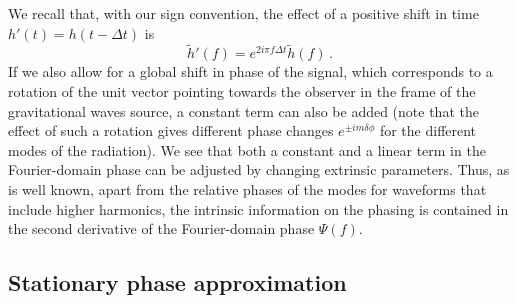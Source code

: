 \documentclass[aps,showpacs,twocolumn,
prd,superscriptaddress,nofootinbib]{revtex4-1}
\newcommand{\be}{\begin{equation}}
\newcommand{\ee}{\end{equation}}
\begin{document}
We recall that, with our sign convention, the effect of a positive shift in time $h' (t) = h(t- \Delta t)$ is
\be
	\tilde{h}'(f) = e^{2i\pi f \Delta t} \tilde{h}(f) \,.
\ee
If we also allow for a global shift in phase of the signal, which corresponds to a rotation of the unit vector pointing towards the observer in the frame of the gravitational waves source, a constant term can also be added (note that the effect of such a rotation gives different phase changes $e^{\pm i m \delta \phi}$ for the different modes of the radiation). We see that both a constant and a linear term in the Fourier-domain phase can be adjusted by changing extrinsic parameters. Thus, as is well known, apart from the relative phases of the modes for waveforms that include higher harmonics, the intrinsic information on the phasing is contained in the second derivative of the Fourier-domain phase $\Psi(f)$.


\subsection{Stationary phase approximation}
\label{subsec:SPA}
\end{document}
